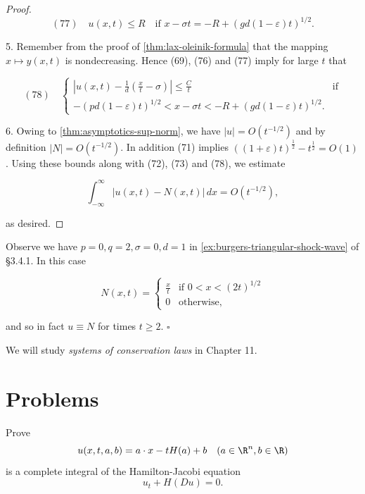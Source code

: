 \begin{proof}
$$(77) \quad u(x,t) \leq R \quad \text{if } x - \sigma t = -R + (gd(1-\varepsilon)t)^{1/2}.$$

5. Remember from the proof of \cref{thm:lax-oleinik-formula} that the mapping $x \mapsto y(x,t)$ is nondecreasing. Hence (69), (76) and (77) imply for large $t$ that

$$(78) \quad \left\{  \begin{array}{ll} |u(x,t) - \frac{1}{d}\left(\frac{x}{t} - \sigma\right)| \leq \frac{C}{t} & \text{if} \\ -(pd(1-\varepsilon)t)^{1/2} < x - \sigma t < -R + (gd(1-\varepsilon)t)^{1/2}. \end{array} \right.$$

6. Owing to \cref{thm:asymptotics-sup-norm}, we have $|u| = O(t^{-1/2})$ and by definition $|N| = O(t^{-1/2})$. In addition (71) implies $((1+\varepsilon)t)^{\frac{1}{2}} - t^{\frac{1}{2}} = O(1)$. Using these bounds along with (72), (73) and (78), we estimate

$$\int_{-\infty}^{\infty} |u(x,t) - N(x,t)| \, dx = O\left(t^{-1/2}\right),$$

as desired.
\end{proof}

\begin{example}
\label{ex:burgers-example-n-wave-specialization}
Observe we have $p = 0, q = 2, \sigma = 0, d = 1$ in \cref{ex:burgers-triangular-shock-wave} of \S 3.4.1. In this case

$$N(x,t) = \begin{cases} \frac{x}{t} & \text{if } 0 < x < (2t)^{1/2} \\ 0 & \text{otherwise}, \end{cases}$$

and so in fact $u \equiv N$ for times $t \geq 2$. $\square$
\end{example}

We will study \textit{systems of conservation laws} in Chapter 11.

\section{Problems}
\label{sec:ch3-problems}

\begin{exercise}
Prove
$$u(x,t,a,b) = a \cdot x - tH(a) + b \quad (a \in \R^n, b \in \R)$$
is a complete integral of the Hamilton-Jacobi equation
$$u_t + H(Du) = 0.$$
\end{exercise}

